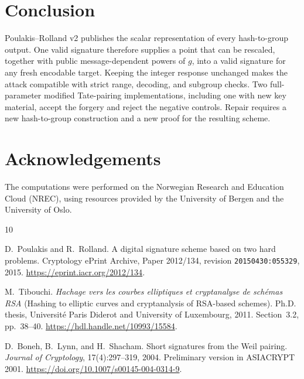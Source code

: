 \documentclass[10pt,a4paper]{article}
\begin{document}
\section{Conclusion}

Poulakis--Rolland v2 publishes the scalar representation of every
hash-to-group output.  One valid signature therefore supplies a point that
can be rescaled, together with public message-dependent powers of $g$, into a
valid signature for any fresh encodable target.  Keeping the integer response
unchanged makes the attack compatible with strict range, decoding, and
subgroup checks.  Two full-parameter modified Tate-pairing implementations,
including one with new key material, accept the forgery and reject the
negative controls.  Repair requires a new hash-to-group construction and a
new proof for the resulting scheme.

\section*{Acknowledgements}

The computations were performed on the Norwegian Research and Education Cloud (NREC), using resources provided by the University of Bergen and the University of Oslo.

\begin{thebibliography}{10}

D.~Poulakis and R.~Rolland.
\newblock A digital signature scheme based on two hard problems.
\newblock Cryptology ePrint Archive, Paper 2012/134, revision
  \texttt{20150430:055329}, 2015.
\newblock \url{https://eprint.iacr.org/2012/134}.

M.~Tibouchi.
\newblock \emph{Hachage vers les courbes elliptiques et cryptanalyse de
  sch\'emas RSA} (Hashing to elliptic curves and cryptanalysis of RSA-based
  schemes).
\newblock Ph.D. thesis, Universit\'e Paris Diderot and University of
  Luxembourg, 2011.  Section~3.2, pp.~38--40.
\newblock \url{https://hdl.handle.net/10993/15584}.

D.~Boneh, B.~Lynn, and H.~Shacham.
\newblock Short signatures from the Weil pairing.
\newblock \emph{Journal of Cryptology}, 17(4):297--319, 2004.  Preliminary
  version in ASIACRYPT 2001.
\newblock \url{https://doi.org/10.1007/s00145-004-0314-9}.

\end{thebibliography}
\end{document}
